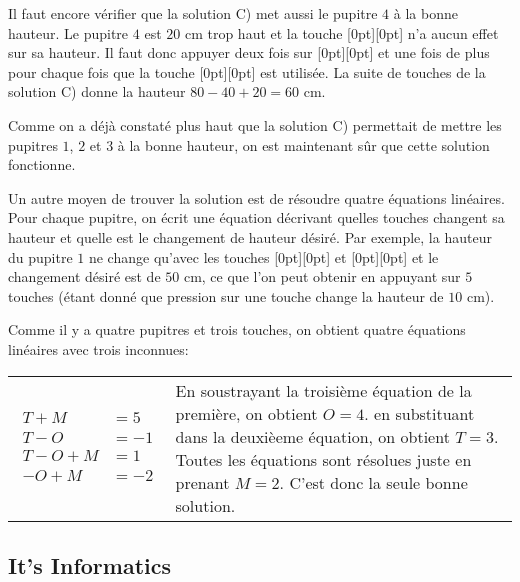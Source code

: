 \documentclass[a4paper,11pt]{report}
\newcommand{\taskGraphicsFolder}{..}
\begin{document}
Il faut encore vérifier que la solution C) met aussi le pupitre $4$ à la bonne hauteur. Le pupitre $4$ est $20$ cm trop haut et la touche \raisebox{-0.5ex}[0pt][0pt]{} n’a aucun effet sur sa hauteur. Il faut donc appuyer deux fois sur \raisebox{-0.5ex}[0pt][0pt]{} et une fois de plus pour chaque fois que la touche \raisebox{-0.5ex}[0pt][0pt]{} est utilisée. La suite de touches de la solution C) donne la hauteur ${80 - 40 + 20 = 60}$ cm.

Comme on a déjà constaté plus haut que la solution C) permettait de mettre les pupitres $1$, $2$ et $3$ à la bonne hauteur, on est maintenant sûr que cette solution fonctionne.

Un autre moyen de trouver la solution est de résoudre quatre équations linéaires. Pour chaque pupitre, on écrit une équation décrivant quelles touches changent sa hauteur et quelle est le changement de hauteur désiré. Par exemple, la hauteur du pupitre $1$ ne change qu’avec les touches \raisebox{-0.5ex}[0pt][0pt]{} et \raisebox{-0.5ex}[0pt][0pt]{} et le changement désiré est de ${50}$ cm, ce que l’on peut obtenir en appuyant sur $5$ touches (étant donné que pression sur une touche change la hauteur de ${10}$ cm).

Comme il y a quatre pupitres et trois touches, on obtient quatre équations linéaires avec trois inconnues:

\begin{tabularx}{\columnwidth}{ @{} l J @{} }
  ${\begin{aligned} T + M &= 5 \\ T - O &= -1 \\ T - O + M &= 1 \\ - O + M &= -2 \end{aligned}}$ & En soustrayant la troisième équation de la première, on obtient ${O = 4}$. en substituant dans la deuxièeme équation, on obtient ${T = 3}$. Toutes les équations sont résolues juste en prenant ${M = 2}$. C’est donc la seule bonne solution.
\end{tabularx}


\subsection*{It’s Informatics}
\end{document}
